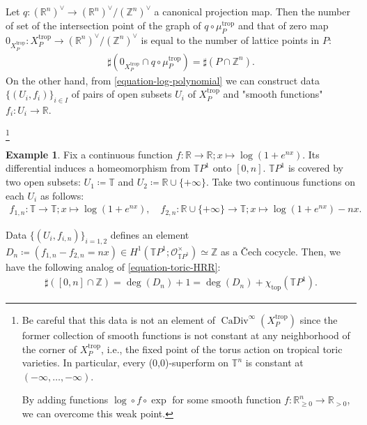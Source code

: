 \documentclass[a4paper,dvipdfmx,reqno,12pt]{amsart}
\theoremstyle{definition}
\newtheorem{example}[theorem]{Example}
\newcommand{\deq}{\coloneqq}
\newcommand{\Z}{\mathbb{Z}}%
\newcommand{\mb}[1]{\mathbb{#1}}%
\newcommand{\mcal}[1]{\mathcal{#1}}%
\newcommand{\opn}[1]{\operatorname{#1}}
\newcommand{\myfootnote}[1]{\hspace{-5pt}\footnote{#1}}
\numberwithin{equation}{section}
\begin{document}
Let 
$q: ({\mathbb{R}}^{n})^{\vee}\to ({\mathbb{R}}^{n})^{\vee}/(\Z^{n})^{\vee}$ 
a canonical projection map.
Then the number of set of the intersection point of 
the graph of $q\circ \mu_P^{\opn{trop}}$ and 
that of zero map 
$0_{X_P^{\opn{trop}}}\colon X_P^{\opn{trop}} \to
({\mathbb{R}}^{n})^{\vee}/(\Z^{n})^{\vee}$ is equal to the 
number of lattice points in $P$:
\begin{align}
\label{equation-moment-map-intersection}
\sharp (0_{X_P^{\opn{trop}}}\cap q\circ\mu_P^{\opn{trop}})
=\sharp (P \cap \Z^{n}).
\end{align}
On the other hand, from \cref{equation-log-polynomial} 
we can construct data $\{(U_i,f_i)\}_{i\in I}$ of 
pairs of open subsets 
$U_i$ of $X_{P}^{\opn{trop}}$ and 
"smooth functions" $f_i\colon U_i \to \mathbb{R}$. 

\myfootnote{
Be careful that this data is not an element
of $\opn{CaDiv}^{\infty}(X_{P}^{\opn{trop}})$ since
 the former collection of smooth functions is not constant
at any neighborhood of the corner of $X_{P}^{\opn{trop}}$,
i.e., the fixed point of the torus action on tropical 
toric varieties.
In particular, every (0,0)-superform on 
$\mathbb{T}^n$ is constant at 
$(-\infty,\ldots,-\infty)$.

By adding functions 
$\opn{log}\circ f \circ\opn{exp}$ for some smooth function
$f\colon \mathbb{R}_{\geq 0}^{n}\to \mathbb{R}_{>0}$,
we can overcome this weak point.
}

\begin{example} \label{eg: TP1Cartier}
Fix a continuous function $f\colon \mathbb{R}\to \mathbb{R}; 
x\mapsto \opn{log}(1+e^{nx})$.
Its differential induces a homeomorphism 
from $\mathbb{T}P^1$ onto $[0,n]$. 
$\mathbb{T}P^{1}$ is covered by two open subsets:
$U_1\deq \mathbb{T}$ and $U_2\deq \mb{R}\cup\{+\infty\}$.
Take two continuous functions on each $U_i$ as follows:
\begin{align}
f_{1,n}\colon \mathbb{T}\to \mathbb{T};
x \mapsto \log (1+e^{nx}),\quad
f_{2,n}\colon \mb{R}\cup\{+\infty\} \to 
\mathbb{T};
x\mapsto \log(1+e^{nx})-nx.
\end{align}

Data $\{(U_i,f_{i,n})\}_{i=1,2}$ defines an element 
$D_n\deq (f_{1,n}-f_{2,n}=nx)\in 
H^{1}(\mb{T}P^1;\mcal{O}_{\mb{T}P^1}^{\times})\simeq \Z$
as a \v{C}ech cocycle.
Then, we have the following analog of 
\cref{equation-toric-HRR}:
\begin{align}
\label{equation-MRR-tropical-line}
\sharp([0,n]\cap \Z)=\opn{deg}(D_n)+1=
\opn{deg}(D_n)+\chi_{\opn{top}}(\mb{T}P^1).
\end{align}
\end{example}
\end{document}
